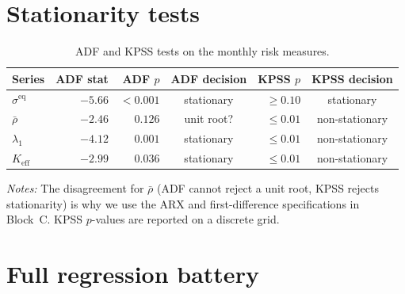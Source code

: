\documentclass[11pt,a4paper]{article}
\newcommand{\rhobar}{\bar{\rho}}
\newcommand{\sigmaEq}{\sigma^{\text{eq}}}
\newcommand{\lambdaOne}{\lambda_1}
\newcommand{\Keff}{K_{\text{eff}}}
\begin{document}
% 
\newpage
\begin{appendices}
% 

\section{Stationarity tests}
\label{app:adf}

\begin{table}[H]
\centering
\caption{ADF and KPSS tests on the monthly risk measures.}
\small
\begin{tabular}{lrrcrc}
\toprule
Series & ADF stat & ADF $p$ & ADF decision & KPSS $p$ & KPSS decision \\
\midrule
$\sigmaEq$   & $-5.66$ & $<0.001$ & stationary  & $\geq 0.10$ & stationary \\
$\rhobar$    & $-2.46$ & $0.126$  & unit root?  & $\leq 0.01$ & non-stationary \\
$\lambdaOne$ & $-4.12$ & $0.001$  & stationary  & $\leq 0.01$ & non-stationary \\
$\Keff$      & $-2.99$ & $0.036$  & stationary  & $\leq 0.01$ & non-stationary \\
\bottomrule
\end{tabular}
\begin{flushleft}
\footnotesize
\textit{Notes:} The disagreement for $\rhobar$ (ADF cannot reject a unit root, KPSS rejects stationarity)
is why we use the ARX and first-difference specifications in Block~C. KPSS $p$-values are reported on a
discrete grid.
\end{flushleft}
\end{table}

\section{Full regression battery}
\label{app:models}


\end{appendices}
\end{document}
